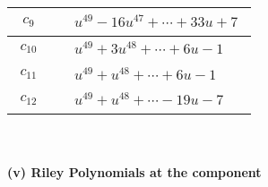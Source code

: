 \documentclass[1p]{elsarticle_modified}
\theoremstyle{definition}
\begin{document}
\begin{tabular}{m{50pt}|m{274pt}}
\hline $$\begin{aligned}c_{9}\end{aligned}$$&$\begin{aligned}
&u^{49}-16 u^{47}+\cdots+33 u+7
\end{aligned}$\\
\hline $$\begin{aligned}c_{10}\end{aligned}$$&$\begin{aligned}
&u^{49}+3 u^{48}+\cdots+6 u-1
\end{aligned}$\\
\hline $$\begin{aligned}c_{11}\end{aligned}$$&$\begin{aligned}
&u^{49}+u^{48}+\cdots+6 u-1
\end{aligned}$\\
\hline $$\begin{aligned}c_{12}\end{aligned}$$&$\begin{aligned}
&u^{49}+u^{48}+\cdots-19 u-7
\end{aligned}$\\
\hline
\end{tabular}\\~\\
\newpage\renewcommand{\arraystretch}{1}
\flushleft \textbf{(v) Riley Polynomials at the component}\newline \\
\end{document}
